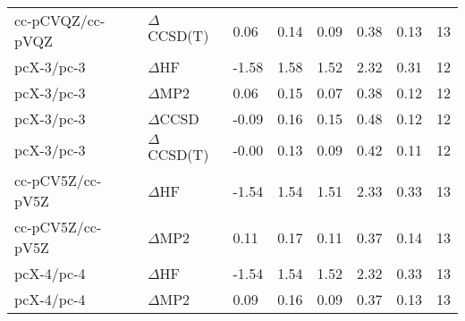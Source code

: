 \begin{table}
\begin{tabular}{l l l l l l l l }
    cc-pCVQZ/cc-pVQZ & $\Delta$CCSD(T) & 0.06 & 0.14 & 0.09 & 0.38 & 0.13 & 13 \\ 
    pcX-3/pc-3 & $\Delta$HF & -1.58 & 1.58 & 1.52 & 2.32 & 0.31 & 12 \\ 
    pcX-3/pc-3 & $\Delta$MP2 & 0.06 & 0.15 & 0.07 & 0.38 & 0.12 & 12 \\ 
    pcX-3/pc-3 & $\Delta$CCSD & -0.09 & 0.16 & 0.15 & 0.48 & 0.12 & 12 \\ 
    pcX-3/pc-3 & $\Delta$CCSD(T) & -0.00 & 0.13 & 0.09 & 0.42 & 0.11 & 12 \\ 
    cc-pCV5Z/cc-pV5Z & $\Delta$HF & -1.54 & 1.54 & 1.51 & 2.33 & 0.33 & 13 \\ 
    cc-pCV5Z/cc-pV5Z & $\Delta$MP2 & 0.11 & 0.17 & 0.11 & 0.37 & 0.14 & 13 \\ 
    pcX-4/pc-4 & $\Delta$HF & -1.54 & 1.54 & 1.52 & 2.32 & 0.33 & 13 \\ 
    pcX-4/pc-4 & $\Delta$MP2 & 0.09 & 0.16 & 0.09 & 0.37 & 0.13 & 13 \\ 
    \bottomrule
  \end{tabular}
\end{table}
